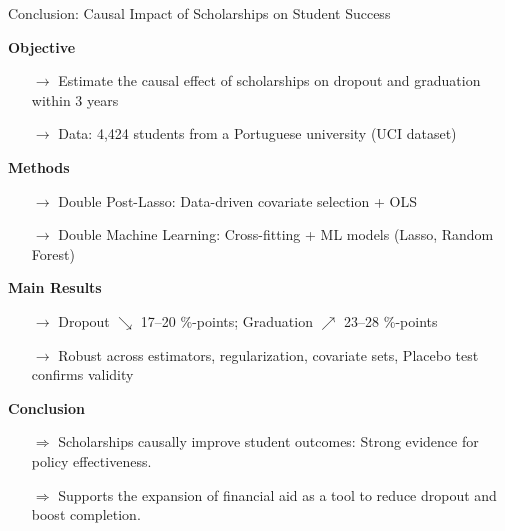 \documentclass[aspectratio=169]{beamer}
\begin{document}
\begin{frame}{Conclusion: Causal Impact of Scholarships on Student Success}
	
	\textbf{Objective} 
	\vspace{-5pt}
	\begin{itemize}
	\item[$\rightarrow$]Estimate the causal effect of scholarships on dropout and graduation within 3 years 
	\item[$\rightarrow$]Data: 4,424 students from a Portuguese university (UCI dataset) 
	\end{itemize}
	\vspace{-5pt}
	
	\textbf{Methods}
	\vspace{-5pt}
	\begin{itemize}
	\item[$\rightarrow$]Double Post-Lasso: Data-driven covariate selection + OLS
	\item[$\rightarrow$]Double Machine Learning: Cross-fitting + ML models (Lasso, Random Forest)
	\end{itemize}
	\vspace{-5pt}
	
	\textbf{Main Results}
	\vspace{-5pt}
	\begin{itemize}
	\item[$\rightarrow$]Dropout $\searrow$ 17–20 \%-points; Graduation $\nearrow$ 23–28 \%-points
	\item[$\rightarrow$]Robust across estimators, regularization, covariate sets, Placebo test confirms validity
	\end{itemize}
	\vspace{-5pt}

	\textbf{Conclusion}
	\vspace{-5pt}
	\begin{itemize}
	\item[$\Rightarrow$]Scholarships causally improve student outcomes: Strong evidence for policy effectiveness.
	\item[$\Rightarrow$]Supports the expansion of financial aid as a tool to reduce dropout and boost completion.
	\end{itemize}
	
\end{frame}

\appendix
\end{document}

